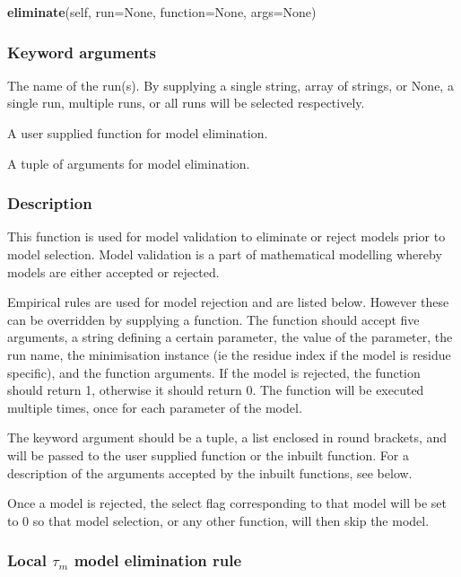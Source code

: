 \textsf{\textbf{eliminate}(self, run=None, function=None, args=None)}


\subsubsection{Keyword arguments}

  The name of the run(s).  By supplying a single string, array of strings, or None, a single run, multiple runs, or all runs will be selected respectively. 

  A user supplied function for model elimination. 

  A tuple of arguments for model elimination. 




\subsubsection{Description}

This function is used for model validation to eliminate or reject models prior to model selection.  Model validation is a part of mathematical modelling whereby models are either accepted or rejected.


Empirical rules are used for model rejection and are listed below.  However these can be overridden by supplying a function.  The function should accept five arguments, a string defining a certain parameter, the value of the parameter, the run name, the minimisation instance (ie the residue index if the model is residue specific), and the function arguments.  If the model is rejected, the function should return 1, otherwise it should return 0.  The function will be executed multiple times, once for each parameter of the model.


The  keyword argument should be a tuple, a list enclosed in round brackets, and will be passed to the user supplied function or the inbuilt function.  For a description of the arguments accepted by the inbuilt functions, see below.


Once a model is rejected, the select flag corresponding to that model will be set to 0 so that model selection, or any other function, will then skip the model.



\subsubsection{Local $\tau_m$ model elimination rule}

